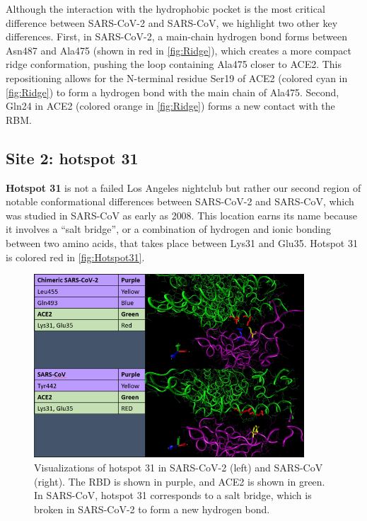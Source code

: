 Although the interaction with the hydrophobic pocket is the most critical difference between SARS-CoV-2 and SARS-CoV, we highlight two other key differences. First, in SARS-CoV-2, a main-chain hydrogen bond forms between Asn487 and Ala475 (shown in red in \autoref{fig:Ridge}), which creates a more compact ridge conformation, pushing the loop containing Ala475 closer to ACE2. This repositioning allows for the N-terminal residue Ser19 of ACE2 (colored cyan in \autoref{fig:Ridge}) to form a hydrogen bond with the main chain of Ala475. Second, Gln24 in ACE2 (colored orange in \autoref{fig:Ridge}) forms a new contact with the RBM.

\FloatBarrier
{}
\subsection{Site 2: hotspot 31}

\textbf{Hotspot 31} is not a failed Los Angeles nightclub but rather our second region of notable conformational differences between SARS-CoV-2 and SARS-CoV, which was studied in SARS-CoV as early as 2008. This location earns its name because it involves a ``salt bridge'', or a combination of hydrogen and ionic bonding between two amino acids, that takes place between Lys31 and Glu35. Hotspot 31 is colored red in \autoref{fig:Hotspot31}.

\begin{qbox}\end{qbox}

\begin{figure}[h]
	\centering
	\mySfFamily
	\includegraphics[width = 0.9\textwidth]{../images/Hotspot31.png}
	\caption{Visualizations of hotspot 31 in SARS-CoV-2 (left) and SARS-CoV (right). The RBD is shown in purple, and ACE2 is shown in green. In SARS-CoV, hotspot 31 corresponds to a salt bridge, which is broken in SARS-CoV-2 to form a new hydrogen bond.}
	\label{fig:Hotspot31}
\end{figure}

